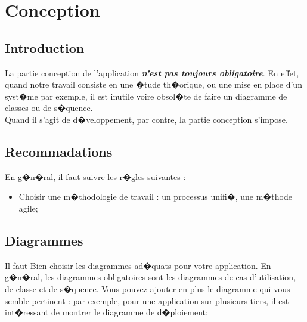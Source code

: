 
\setcounter{chapter}{1}
\chapter{Conception}
\minitoc %
\graphicspath{{Chapitre2/figures/}}


\pagestyle{fancy}
\fancyhf{}
\fancyhead[R]{\bfseries\rightmark}
\fancyfoot[R]{\thepage}
\renewcommand{\headrulewidth}{0.5pt}
\renewcommand{\footrulewidth}{0pt}
\renewcommand{\chaptermark}[1]{\markboth{\MakeUppercase{\chaptername~\thechapter. #1 }}{}}
\renewcommand{\sectionmark}[1]{\markright{\thechapter.\thesection~ #1}}

\begin{spacing}{1.2}
\section*{Introduction}
La partie conception de l'application \textbf{\textsl{n'est pas toujours obligatoire}}. En effet, quand notre travail consiste en une �tude th�orique, ou une mise en place d'un syst�me par exemple, 
il est inutile voire obsol�te de faire un diagramme de classes ou de s�quence.\\
Quand il s'agit de d�veloppement, par contre, la partie conception s'impose. 
\section{Recommadations}
En g�n�ral, 
il faut suivre les r�gles suivantes :
\begin{itemize}
	\item Choisir une m�thodologie de travail : un processus unifi�, une m�thode agile;
\end{itemize}
\section{Diagrammes}
Il faut Bien choisir les diagrammes ad�quats pour votre application. En g�n�ral, les
diagrammes obligatoires sont les diagrammes de cas d'utilisation, de classe et de 
s�quence. Vous pouvez ajouter en plus le diagramme qui vous semble pertinent :
par exemple, pour une application sur plusieurs tiers, il est int�ressant de
montrer le diagramme de d�ploiement;
\begin{itemize}


\end{itemize}
\end{spacing}
